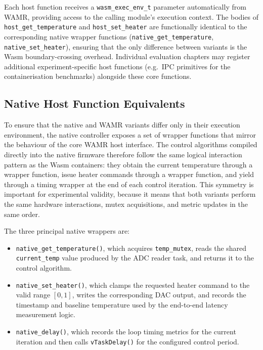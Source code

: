 \documentclass[12pt, a4paper]{report}
\begin{document}
Each host function receives a \texttt{wasm\_exec\_env\_t} parameter automatically from WAMR, providing access to the calling module's execution context. The bodies of \texttt{host\_get\_temperature} and \texttt{host\_set\_heater} are functionally identical to the corresponding native wrapper functions (\texttt{native\_get\_temperature}, \texttt{native\_set\_heater}), ensuring that the only difference between variants is the Wasm boundary-crossing overhead. Individual evaluation chapters may register additional experiment-specific host functions (e.g.\ IPC primitives for the containerisation benchmarks) alongside these core functions.


\subsection{Native Host Function Equivalents}
\label{subsec:native-control}

To ensure that the native and WAMR variants differ only in their execution environment, the native
controller exposes a set of wrapper functions that mirror the behaviour of the core WAMR host
interface. The control algorithms compiled directly into the native firmware therefore follow the
same logical interaction pattern as the Wasm containers: they obtain the current temperature
through a wrapper function, issue heater commands through a wrapper function, and yield through a
timing wrapper at the end of each control iteration. This symmetry is important for experimental
validity, because it means that both variants perform the same hardware interactions, mutex
acquisitions, and metric updates in the same order.

The three principal native wrappers are:

\begin{itemize}
    \item \texttt{native\_get\_temperature()}, which acquires \texttt{temp\_mutex}, reads the
    shared \texttt{current\_temp} value produced by the ADC reader task, and returns it to the control
    algorithm.
    \item \texttt{native\_set\_heater()}, which clamps the requested heater command to the valid
    range $[0,1]$, writes the corresponding DAC output, and records the timestamp and baseline
    temperature used by the end-to-end latency measurement logic.
    \item \texttt{native\_delay()}, which records the loop timing metrics for the current iteration
    and then calls \texttt{vTaskDelay()} for the configured control period.
\end{itemize}
\end{document}
